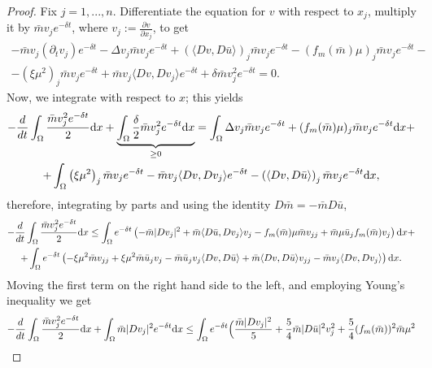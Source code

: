 \documentclass[10pt,a4paper,nouppercase,nowrite]{article}
\numberwithin{equation}{section}
\newcommand{\di}{{\rm d}}
\theoremstyle{definition}
\begin{document}
	\begin{proof}
		Fix $j=1,...,n$. Differentiate the equation for $v$ with respect to $x_j$, multiply it by $\bar{m} v_j e^{-\delta t}$, where $v_j:=\frac{\partial v}{\partial x_j}$, to get
		\begin{multline*}
			-\bar{m} v_j \left( \partial_t v_j \right) e^{-\delta t} - \Delta v_j \bar{m} v_j e^{-\delta t} + \left( \langle Dv,D\bar{u} \rangle \right)_j \bar{m} v_j e^{-\delta t} - (f_m(\bar{m}) \mu)_j \bar{m} v_j e^{-\delta t} -\\
			- \left( \xi \mu^2 \right)_j \bar{m} v_j e^{-\delta t} + \bar{m} v_j \langle Dv,Dv_j \rangle e^{-\delta t} + \delta \bar{m} v_j^2 e^{-\delta t}= 0.
		\end{multline*}
		Now, we integrate with respect to $x$; this yields
		\begin{multline*}
			-\frac{d}{dt} \int_{\Omega} \frac{\bar{m}v_j^2 e^{-\delta t}}{2} \di x + \underbrace{\int_{\Omega} \frac{\delta}{2} \bar{m} v_j^2 e^{-\delta t} \di x}_{\geq 0} = \int_{\Omega} \Delta v_j \bar{m} v_j e^{-\delta t} + (f_m(\bar{m}) \mu)_j \bar{m} v_j e^{-\delta t} \di x + \\
			+ \int_{\Omega} \left( \xi \mu^2 \right)_j \bar{m} v_j e^{-\delta t} -  \bar{m} v_j \langle Dv,Dv_j \rangle  e^{-\delta t} - \left( \langle Dv,D\bar{u} \rangle \right)_j \bar{m} v_j e^{-\delta t} \di x,
		\end{multline*}
		therefore, integrating by parts and using the identity $D \bar m = - \bar m D \bar u $,
		\begin{multline*}
			-\frac{d}{dt} \int_{\Omega} \frac{\bar{m}v_j^2 e^{-\delta t}}{2} \di x  \le \int_{\Omega} e^{-\delta t} \left( - \bar{m} |Dv_j|^2 + \bar{m} \langle D\bar{u},Dv_j \rangle v_j - f_m(\bar{m}) \mu \bar{m} v_{jj} + \bar{m} \mu \bar{u}_j f_{m}(\bar{m}) v_j \right) \di x +  \\
			+ \int_{\Omega} e^{-\delta t} \left( - \xi \mu^2 \bar{m} v_{jj} + \xi \mu^2 \bar{m} \bar{u}_j v_j - \bar{m} \bar{u}_j v_j \langle Dv,D\bar{u} \rangle + \bar{m} \langle Dv,D\bar{u} \rangle v_{jj} - \bar{m} v_j \langle Dv,Dv_j \rangle \right) \di x.
		\end{multline*}
		Moving the first term on the right hand side to the left, and employing Young's inequality we get
		\begin{multline*}
			-\frac{d}{dt} \int_{\Omega} \frac{\bar{m}v_j^2 e^{-\delta t}}{2} \di x + \int_{\Omega} \bar{m}|Dv_j|^2 e^{-\delta t} \di x \le 
			\int_{\Omega} e^{-\delta t} \Big( \frac{\bar{m}|Dv_j|^2}{5} + \frac{5}{4} \bar{m} |D\bar{u}|^2 v_j^2 + \frac{5}{4} (f_m(\bar{m}))^2 \bar{m}{\mu^2} \\

\end{multline*}
\end{proof}
\end{document}
